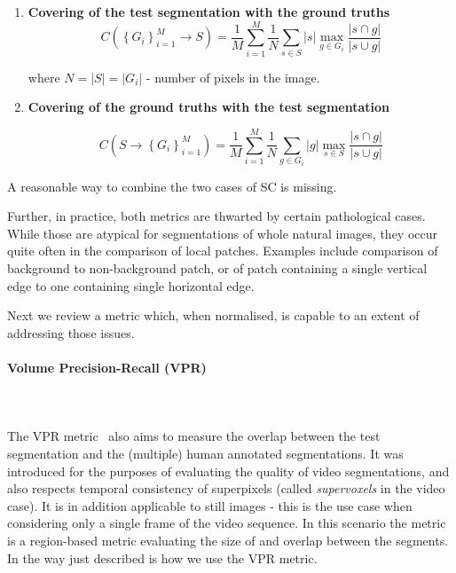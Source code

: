 \begin{enumerate}
\item{\textbf{Covering of the test segmentation with the ground truths}}
\[
C\left(\left\{ {G_{i}}\right\} _{i=1}^{M}\longrightarrow S\right)=\frac{1}{M}\sum\limits _{i=1}^{M}\frac{1}{N}\sum\limits _{s\in S}\left|s\right|\max_{g\in G_{i}}\frac{\left|s\cap g\right|}{\left|s\cup g\right|}
\]

where $N=\left|S\right|=\left|G_{i}\right|$ - number of pixels in the image.

\item{\textbf{Covering of the ground truths with the test segmentation}}

\[
C\left(S\longrightarrow\left\{ {G_{i}}\right\} _{i=1}^{M}\right)=\frac{1}{M}\sum\limits _{i=1}^{M}\frac{1}{N}\sum\limits _{g\in G_{i}}\left|g\right|\max_{s\in S}\frac{\left|s\cap g\right|}{\left|s\cup g\right|}
\]
\end{enumerate}
A reasonable %
way to combine the two cases of SC is missing.

Further, in practice, both metrics are thwarted by certain pathological cases. While those are atypical for segmentations of whole natural images, they occur quite often in the comparison of local patches. Examples include comparison of background to non-background patch, or of patch containing a single vertical edge to one containing single horizontal edge. 

Next we review a metric which, when normalised, is capable to an extent of addressing those issues.

\paragraph{Volume Precision-Recall (VPR)}\mbox{}\\\mbox{}\\
\label{sec:ch4-VPR-maths}
The VPR metric~\cite{Galasso13} also aims to measure the overlap between the test segmentation and the (multiple) human annotated segmentations. It was introduced for the purposes of evaluating the quality of video segmentations, and also respects temporal consistency of superpixels (called \textit{supervoxels} in the video case). It is in addition applicable to %
still images - this is the use case when considering only a single frame of the video sequence. In this scenario the metric is a region-based metric evaluating the size of and overlap between the segments. 
In the way just described is how we use the VPR metric.

